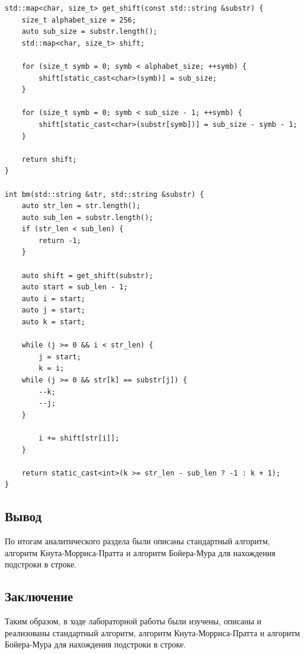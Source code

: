 \documentclass[12pt]{report}
\begin{document}
\begin{lstlisting}[frame=single,caption=Стандартный алгоритм, breaklines]
std::map<char, size_t> get_shift(const std::string &substr) {
	size_t alphabet_size = 256;
	auto sub_size = substr.length();
	std::map<char, size_t> shift;
	
	for (size_t symb = 0; symb < alphabet_size; ++symb) {
		shift[static_cast<char>(symb)] = sub_size;
	}
	
	for (size_t symb = 0; symb < sub_size - 1; ++symb) {
		shift[static_cast<char>(substr[symb])] = sub_size - symb - 1;
	}
	
	return shift;
}

int bm(std::string &str, std::string &substr) {
	auto str_len = str.length();
	auto sub_len = substr.length();
	if (str_len < sub_len) {
		return -1;
	}
	
	auto shift = get_shift(substr);
	auto start = sub_len - 1;
	auto i = start;
	auto j = start;
	auto k = start;
	
	while (j >= 0 && i < str_len) {
		j = start;
		k = i;
	while (j >= 0 && str[k] == substr[j]) {
		--k;
		--j;
	}
	
		i += shift[str[i]];
	}
	
	return static_cast<int>(k >= str_len - sub_len ? -1 : k + 1);
}

\end{lstlisting}
\begin{center}
	\section*{Вывод}
\end{center}	
По итогам аналитического раздела были описаны стандартный алгоритм, алгоритм Кнута-Морриса-Пратта и алгоритм Бойера-Мура для нахождения подстроки в строке.



\begin{center}
	\chapter*{Заключение}
\end{center}
\label{sec:ending}


Таким образом, в ходе лабораторной работы были изучены, описаны и реализованы стандартный алгоритм, алгоритм Кнута-Морриса-Пратта и алгоритм Бойера-Мура для нахождения подстроки в строке. 
\end{document}
